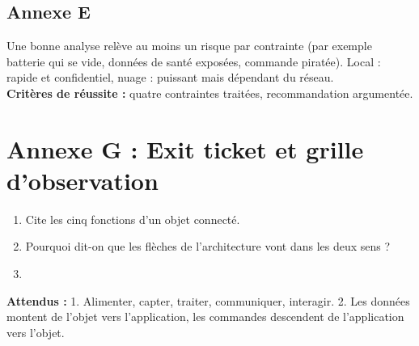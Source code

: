 \documentclass[11pt,a4paper]{article}
\begin{document}
\subsection*{Annexe E}
Une bonne analyse relève au moins un risque par contrainte (par exemple batterie qui se vide, données de santé exposées, commande piratée). Local : rapide et confidentiel, nuage : puissant mais dépendant du réseau.\\
\textbf{Critères de réussite :} quatre contraintes traitées, recommandation argumentée.

\newpage
\section*{Annexe G : Exit ticket et grille d'observation}

\begin{enumerate}
 \item Cite les cinq fonctions d'un objet connecté.\\ \lig
 \item Pourquoi dit-on que les flèches de l'architecture vont dans les deux sens ?\\ \lig
 \item \autoeval
\end{enumerate}
\textbf{Attendus :} 1. Alimenter, capter, traiter, communiquer, interagir. 2. Les données montent de l'objet vers l'application, les commandes descendent de l'application vers l'objet.

\bigskip
{}
\end{document}
